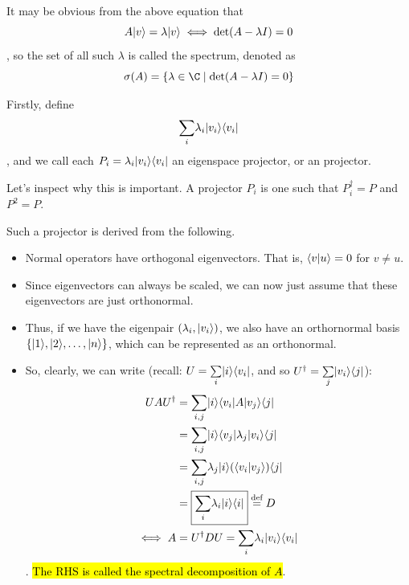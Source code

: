 \documentclass[12pt]{article}
\begin{document}
\begin{definition}[Spectrum]
It may be obvious from the above equation that $$
A\Ket{v} = \lambda \Ket{v}\iff \det(A - \lambda I) = 0
$$, so the set of all such $\lambda$ is called the spectrum, denoted as $$
\sigma(A) = \{\lambda \in \C \mid \det(A-\lambda I) = 0\}
$$
\end{definition}

\begin{definition}
Firstly, define $$
\underset{i}{\sum}\lambda_i\Ket{v_i}\Bra{v_i}
$$, and we call each $P_i = \lambda_i\Ket{v_i}\Bra{v_i}$ an eigenspace projector, or an projector.

Let's inspect why this is important. A projector $P_i$ is one such that $P_i^\dag = P$ and $P^2 = P$.

Such a projector is derived from the following.
\begin{itemize}
    \item Normal operators have orthogonal eigenvectors. That is, $\bk{v}{u} = 0$ for $v\neq u$.
    \item Since eigenvectors can always be scaled, we can now just assume that these eigenvectors are just orthonormal.
    \item Thus, if we have the eigenpair $(\lambda_i, \Ket{v_i})$, we also have an orthornormal basis $\{\Ket{1}, \Ket{2}, \ldots, \Ket{n}\}$, which can be represented as an orthonormal.
    \item So, clearly, we can write (recall: $U = \underset{i}{\sum}\Ket{i}\Bra{v_i}$, and so $U^\dag = \underset{j}{\sum}\Ket{v_i}\Bra{j}$): $$
    \begin{aligned}
    UAU^\dag
        &= \underset{i,j}{\sum}\Ket{i}\Bra{v_i} A\Ket{v_j}\Bra{j}\\
        &= \underset{i,j}{\sum}\Ket{i}\Bra{v_j} \lambda_j \Ket{v_i}\Bra{j}\\
        &= \underset{i,j}{\sum}\lambda_j\Ket{i}(\bk{v_i}{v_j})\Bra{j}\\
        &= \boxed{\underset{i}{\sum}\lambda_i\Ket{i}\Bra{i}} \overset{\text{def}}{=} D\\
    \iff A
        &= U^\dag DU = \underset{i}{\sum}\lambda_i\Ket{v_i}\Bra{v_i}
    \end{aligned}
    $$. \hl{The RHS is called the spectral decomposition of $A$}.
\end{itemize}
\end{definition}
\end{document}
